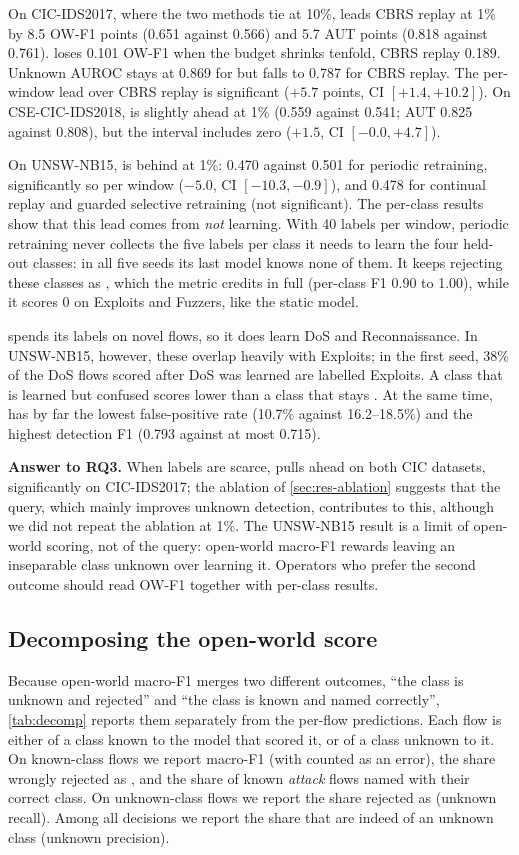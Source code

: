 On CIC-IDS2017, where the two methods tie at 10\%, \nova{} leads CBRS replay at 1\% by 8.5 OW-F1 points (0.651
against 0.566) and 5.7 AUT points (0.818 against 0.761). \nova{} loses 0.101 OW-F1 when the budget shrinks
tenfold, CBRS replay 0.189. Unknown AUROC stays at 0.869 for \nova{} but falls to 0.787 for CBRS replay. The
per-window lead over CBRS replay is significant ($+5.7$ points, CI $[+1.4, +10.2]$). On CSE-CIC-IDS2018, \nova{}
is slightly ahead at 1\% (0.559 against 0.541; AUT 0.825 against 0.808), but the interval includes zero ($+1.5$,
CI $[-0.0, +4.7]$).

On UNSW-NB15, \nova{} is behind at 1\%: 0.470 against 0.501 for periodic retraining, significantly so per window
($-5.0$, CI $[-10.3, -0.9]$), and 0.478 for continual replay and guarded selective retraining (not significant). The per-class results show that this lead comes from \emph{not} learning. With
40 labels per window, periodic retraining never collects the five labels per class it needs to learn the four
held-out classes: in all five seeds its last model knows none of them. It keeps rejecting these classes as \unk{}, which the metric credits in full
(per-class F1 0.90 to 1.00), while it scores 0 on Exploits and Fuzzers, like the static model.

\nova{} spends its labels on novel flows, so it does learn DoS and Reconnaissance. In UNSW-NB15, however, these
overlap heavily with Exploits; in the first seed, 38\% of the DoS flows scored after DoS was learned are labelled
Exploits. A class that is learned but confused scores lower than a class that stays \unk{}. At the same time,
\nova{} has by far the lowest false-positive rate (10.7\% against 16.2--18.5\%) and the highest detection F1 (0.793
against at most 0.715).

\textbf{Answer to RQ3.} When labels are scarce, \nova{} pulls ahead on both CIC datasets, significantly on
CIC-IDS2017; the ablation of
\cref{sec:res-ablation} suggests that the query, which mainly improves unknown detection, contributes to this,
although we did not repeat the ablation at 1\%. The UNSW-NB15 result is a limit of open-world scoring, not of the query: open-world macro-F1 rewards
leaving an inseparable class unknown over learning it. Operators who prefer the second outcome should read
OW-F1 together with per-class results.

\subsection{Decomposing the open-world score}
\label{sec:res-decomp}
Because open-world macro-F1 merges two different outcomes, ``the class is unknown and rejected'' and ``the class
is known and named correctly'', \cref{tab:decomp} reports them separately from the per-flow predictions. Each flow
is either of a class known to the model that scored it, or of a class unknown to it. On known-class flows we
report macro-F1 (with \unk{} counted as an error), the share wrongly rejected as \unk{}, and the share of known
\emph{attack} flows named with their correct class. On unknown-class flows we report the share rejected as \unk{}
(unknown recall). Among all \unk{} decisions we report the share that are indeed of an unknown class (unknown
precision).

